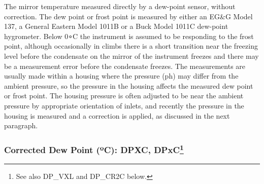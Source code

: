 \documentclass[
  english,
]{book}
\begin{document}
The mirror temperature measured directly by a dew-point sensor, without correction. The dew point or frost point is measured by either an EG\&G Model 137, a General Eastern Model 1011B or a Buck Model 1011C dew-point hygrometer. Below 0{∘}C the instrument is assumed to be responding to the frost point, although occasionally in climbs there is a short transition near the freezing level before the condensate on the mirror of the instrument freezes and there may be a measurement error before the condensate freezes. The measurements are usually made within a housing where the pressure ({ph)} may differ from the ambient pressure, so the pressure in the housing affects the measured dew point or frost point. The housing pressure is often adjusted to be near the ambient pressure by appropriate orientation of inlets, and recently the pressure in the housing is measured and a correction is applied, as discussed in the next paragraph.

\hypertarget{dewpt-corrected}{%
\subsubsection*{\texorpdfstring{Corrected Dew Point ({º}C): DPXC, DPxC\footnote{See also DP\_VXL and DP\_CR2C below.}}{Corrected Dew Point (ºC): DPXC, DPxC}}\label{dewpt-corrected}}
\end{document}
